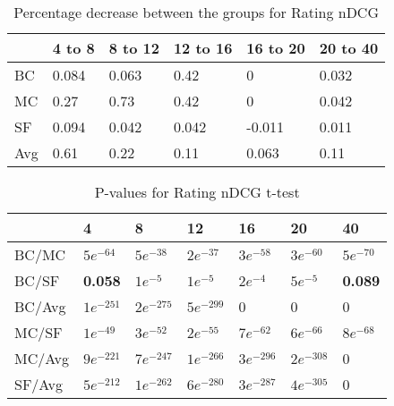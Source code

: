 \begin{table}[H]
	\centering
	\begin{tabular}{|l|lllll|}\hline
		& 4 to 8 & 8 to 12 & 12 to 16 & 16 to 20 & 20 to 40 \\\hline
		BC 	& 0.084	& 0.063	& 0.42	& 0		& 0.032 \\
		MC  & 0.27	& 0.73	& 0.42	& 0		& 0.042 \\
		SF  & 0.094	& 0.042	& 0.042	&-0.011	& 0.011 \\
		Avg	& 0.61	& 0.22 	& 0.11	& 0.063	& 0.11  \\ \hline
	\end{tabular}
	\caption{Percentage decrease between the groups for Rating nDCG}
	\label{tbl:andcg}
\end{table}

\begin{table}[H]
	\centering
	\begin{tabular}{|l|llllll|}\hline
		& 4 & 8 & 12 & 16 & 20 & 40 \\\hline
		BC/MC	& $5e^{-64}$	& $5e^{-38}$	& $2e^{-37}$	& $3e^{-58}$	& $3e^{-60}$ & $5e^{-70}$ \\
		BC/SF	& \textbf{0.058}	& $1e^{-5}$	& $1e^{-5}$	& $2e^{-4}$	& $5e^{-5}$ & \textbf{0.089} \\
		BC/Avg	& $1e^{-251}$	& $2e^{-275}$ 	& $5e^{-299}$	& 0	& 0 & 0 \\
		MC/SF	& $1e^{-49}$	& $3e^{-52}$ 	& $2e^{-55}$	& $7e^{-62}$	& $6e^{-66}$ & $8e^{-68}$ \\
		MC/Avg	& $9e^{-221}$	& $7e^{-247}$ 	& $1e^{-266}$	& $3e^{-296}$	& $2e^{-308}$ & 0 \\
		SF/Avg	& $5e^{-212}$	& $1e^{-262}$ 	& $6e^{-280}$	& $3e^{-287}$	& $4e^{-305}$ & 0 \\ \hline
	\end{tabular}
	\caption{P-values for Rating nDCG t-test}
	\label{tbl:andcg_ttest}
\end{table}
